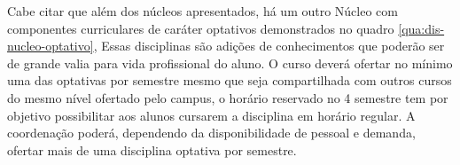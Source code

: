 
Cabe citar que além dos núcleos apresentados, há um outro Núcleo com componentes curriculares de caráter optativos demonstrados no quadro \ref{qua:dis-nucleo-optativo}, Essas disciplinas são adições de conhecimentos que poderão ser de grande valia para vida profissional do aluno. O curso deverá ofertar no mínimo uma das optativas por semestre mesmo que seja compartilhada com outros cursos do mesmo nível ofertado pelo campus, o horário reservado no 4 semestre tem por objetivo possibilitar aos alunos cursarem a disciplina em horário regular. A coordenação poderá, dependendo da disponibilidade de pessoal e demanda, ofertar mais de uma disciplina optativa por semestre.\\

\begin{quadro}[!h]	
\centering
{}		
\end{quadro}


